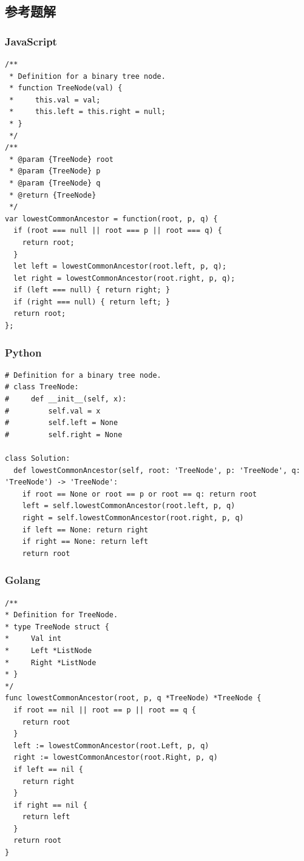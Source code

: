 \subsection{参考题解}

\subsubsection{JavaScript}

\begin{verbatim}
/**
 * Definition for a binary tree node.
 * function TreeNode(val) {
 *     this.val = val;
 *     this.left = this.right = null;
 * }
 */
/**
 * @param {TreeNode} root
 * @param {TreeNode} p
 * @param {TreeNode} q
 * @return {TreeNode}
 */
var lowestCommonAncestor = function(root, p, q) {
  if (root === null || root === p || root === q) {
    return root;
  }
  let left = lowestCommonAncestor(root.left, p, q);
  let right = lowestCommonAncestor(root.right, p, q);
  if (left === null) { return right; }
  if (right === null) { return left; }
  return root;
};
\end{verbatim}

\subsubsection{Python}

\begin{verbatim}
# Definition for a binary tree node.
# class TreeNode:
#     def __init__(self, x):
#         self.val = x
#         self.left = None
#         self.right = None

class Solution:
  def lowestCommonAncestor(self, root: 'TreeNode', p: 'TreeNode', q: 'TreeNode') -> 'TreeNode':
    if root == None or root == p or root == q: return root
    left = self.lowestCommonAncestor(root.left, p, q)
    right = self.lowestCommonAncestor(root.right, p, q)
    if left == None: return right
    if right == None: return left
    return root
\end{verbatim}

\subsubsection{Golang}

\begin{verbatim}
/**
* Definition for TreeNode.
* type TreeNode struct {
*     Val int
*     Left *ListNode
*     Right *ListNode
* }
*/
func lowestCommonAncestor(root, p, q *TreeNode) *TreeNode {
  if root == nil || root == p || root == q {
    return root
  }
  left := lowestCommonAncestor(root.Left, p, q)
  right := lowestCommonAncestor(root.Right, p, q)
  if left == nil {
    return right
  }
  if right == nil {
    return left
  }
  return root
}
\end{verbatim}
